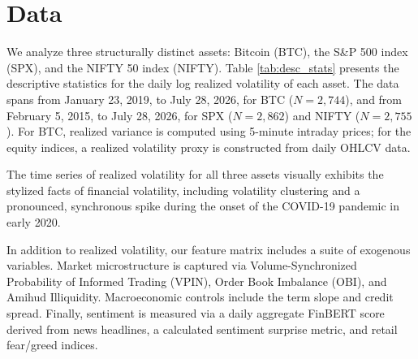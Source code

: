 \section{Data}
\label{sec:data}
We analyze three structurally distinct assets: Bitcoin (BTC), the S\&P 500 index (SPX), and the NIFTY 50 index (NIFTY). Table \ref{tab:desc_stats} presents the descriptive statistics for the daily log realized volatility of each asset. The data spans from January 23, 2019, to July 28, 2026, for BTC ($N=2,744$), and from February 5, 2015, to July 28, 2026, for SPX ($N=2,862$) and NIFTY ($N=2,755$). For BTC, realized variance is computed using 5-minute intraday prices; for the equity indices, a realized volatility proxy is constructed from daily OHLCV data.



The time series of realized volatility for all three assets visually exhibits the stylized facts of financial volatility, including volatility clustering and a pronounced, synchronous spike during the onset of the COVID-19 pandemic in early 2020. 

In addition to realized volatility, our feature matrix includes a suite of exogenous variables. Market microstructure is captured via Volume-Synchronized Probability of Informed Trading (VPIN), Order Book Imbalance (OBI), and Amihud Illiquidity. Macroeconomic controls include the term slope and credit spread. Finally, sentiment is measured via a daily aggregate FinBERT score derived from news headlines, a calculated sentiment surprise metric, and retail fear/greed indices.
